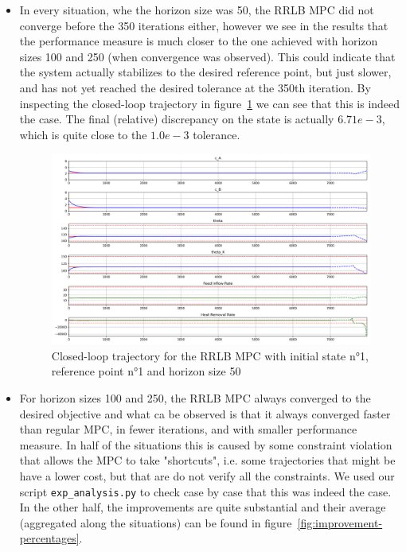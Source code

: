\documentclass[12pt]{article}
\begin{document}
\begin{itemize}[label=\textbullet]
	\item In every situation, whe the horizon size was 50, the RRLB MPC did not converge before the 350 iterations either, however we see in the results that the performance measure is much closer to the one achieved with horizon sizes 100 and 250 (when convergence was observed).
	This could indicate that the system actually stabilizes to the desired reference point, but just slower, and has not yet reached the desired tolerance at the 350th iteration.
	By inspecting the closed-loop trajectory in figure~\ref{fig:closedloop_traj_rrlb_1_1_50} we can see that this is indeed the case.
	The final (relative) discrepancy on the state is actually $6.71e-3$, which is quite close to the $1.0e-3$ tolerance.

	\begin{figure}[!ht]
		\centering
		\includegraphics[width=15cm]{images/closedloop_traj_rrlb_1_1_50.png}
		\caption{Closed-loop trajectory for the RRLB MPC with initial state n°1, reference point n°1 and horizon size 50}
		\label{fig:closedloop_traj_rrlb_1_1_50}
	\end{figure}

	\item For horizon sizes 100 and 250, the RRLB MPC always converged to the desired objective and what ca be observed is that it always converged faster than regular MPC, in fewer iterations, and with smaller performance measure.
	In half of the situations this is caused by some constraint violation that allows the MPC to take "shortcuts", i.e. some trajectories that might be have a lower cost, but that are do not verify all the constraints.
	We used our script \verb|exp_analysis.py| to check case by case that this was indeed the case.
	In the other half, the improvements are quite substantial and their average (aggregated along the situations) can be found in figure~\ref{fig:improvement-percentages}.


\end{itemize}
\end{document}
